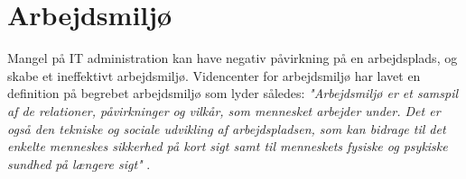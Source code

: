 

\section{Arbejdsmiljø}
\noindent Mangel på IT administration kan have negativ påvirkning på en arbejdsplads, og skabe et ineffektivt arbejdsmiljø. Videncenter for arbejdsmiljø har lavet en definition på begrebet arbejdsmiljø som lyder således: \textit{"Arbejdsmiljø er et samspil af de relationer, påvirkninger og vilkår, som mennesket arbejder under. Det er også den tekniske og sociale udvikling af arbejdspladsen, som kan bidrage til det enkelte menneskes sikkerhed på kort sigt samt til menneskets fysiske og psykiske sundhed på længere sigt"} \citep{Arbejdsmiljoe}.

